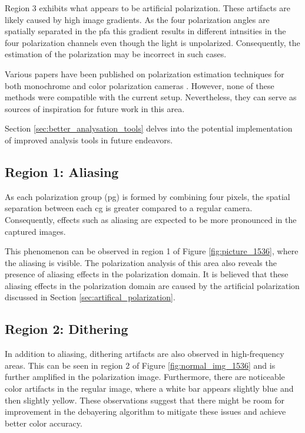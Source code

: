 Region 3 exhibits what appears to be artificial polarization.
These artifacts are likely caused by high image gradients.
As the four polarization angles are spatially separated in the \gls{pfa} this gradient results in different intnsities in the four polarization channels even though the light is unpolarized.
Consequently, the estimation of the polarization may be incorrect in such cases.

Various papers have been published on polarization estimation techniques for both monochrome and color polarization cameras \cite{mihoubiSurveyDemosaickingMethods2018} \cite{spoteJointDemosaicingColour2021}.
However, none of these methods were compatible with the current setup.
Nevertheless, they can serve as sources of inspiration for future work in this area.

Section \ref{sec:better_analysation_tools} delves into the potential implementation of improved analysis tools in future endeavors.

\subsection{Region 1: Aliasing}
As each polarization group (\gls{pg}) is formed by combining four pixels, the spatial separation between each \gls{cg} is greater compared to a regular camera.
Consequently, effects such as aliasing are expected to be more pronounced in the captured images.

This phenomenon can be observed in region 1 of Figure \ref{fig:picture_1536}, where the aliasing is visible.
The polarization analysis of this area also reveals the presence of aliasing effects in the polarization domain.
It is believed that these aliasing effects in the polarization domain are caused by the artificial polarization discussed in Section \ref{sec:artifical_polarization}.


\subsection{Region 2: Dithering}

In addition to aliasing, dithering artifacts are also observed in high-frequency areas.
This can be seen in region 2 of Figure \ref{fig:normal_img_1536} and is further amplified in the polarization image.
Furthermore, there are noticeable color artifacts in the regular image, where a white bar appears slightly blue and then slightly yellow.
These observations suggest that there might be room for improvement in the debayering algorithm to mitigate these issues and achieve better color accuracy.

